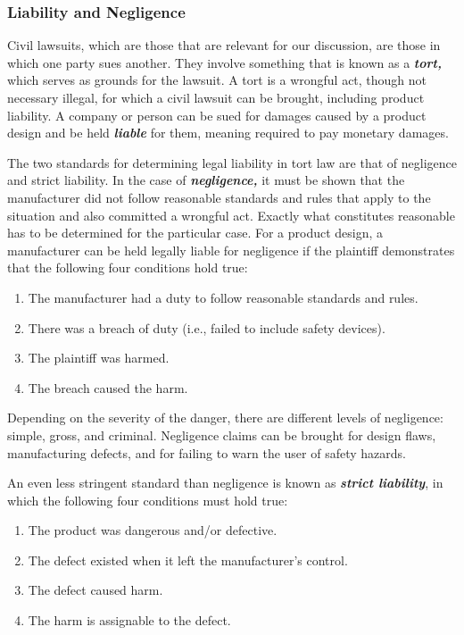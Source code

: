 \subsubsection{Liability and Negligence}\label{liability-and-negligence}

Civil lawsuits, which are those that are relevant for our discussion,
are those in which one party sues another. They involve something that
is known as a \emph{\textbf{tort,}} which serves as grounds for the
lawsuit. A tort is a wrongful act, though not necessary illegal, for
which a civil lawsuit can be brought, including product liability. A
company or person can be sued for damages caused by a product design and
be held \emph{\textbf{liable}} for them, meaning required to pay
monetary damages.

The two standards for determining legal liability in tort law are that
of negligence and strict liability. In the case of
\emph{\textbf{negligence,}} it must be shown that the manufacturer did
not follow reasonable standards and rules that apply to the situation
and also committed a wrongful act. Exactly what constitutes reasonable
has to be determined for the particular case. For a product design, a
manufacturer can be held legally liable for negligence if the plaintiff
demonstrates that the following four conditions hold true:

\begin{enumerate}
\def\labelenumi{\arabic{enumi}.}
\item
  The manufacturer had a duty to follow reasonable standards and rules.
\item
  There was a breach of duty (i.e., failed to include safety devices).
\item
  The plaintiff was harmed.
\item
  The breach caused the harm.
\end{enumerate}

Depending on the severity of the danger, there are different levels of
negligence: simple, gross, and criminal. Negligence claims can be
brought for design flaws, manufacturing defects, and for failing to warn
the user of safety hazards.

An even less stringent standard than negligence is known as
\emph{\textbf{strict liability}}, in which the following four conditions
must hold true:

\begin{enumerate}
\def\labelenumi{\arabic{enumi}.}
\item
  The product was dangerous and/or defective.
\item
  The defect existed when it left the manufacturer's control.
\item
  The defect caused harm.
\item
  The harm is assignable to the defect.
\end{enumerate}

